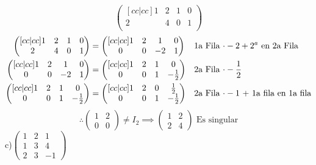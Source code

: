 \documentclass[letterpaper]{article}
\renewcommand{\*}{\cdot}
\theoremstyle{definition}
\begin{document}
	\[\begin{pmatrix}[cc|cc]
	1 & 2 & 1 & 0 \\
	2 & 4 & 0 & 1 \\
	\end{pmatrix}\]
	\begin{align*}
		\begin{pmatrix}[cc|cc]
		1 & 2 & 1 & 0 \\
		2 & 4 & 0 & 1 \\
		\end{pmatrix} & = \begin{pmatrix}[cc|cc]
		1 & 2 & 1 & 0 \\
		0 & 0 & -2 & 1 \\
		\end{pmatrix} && \text{1a Fila $ \* -2  + 2^a$ en 2a Fila}\\
		\begin{pmatrix}[cc|cc]
		1 & 2 & 1 & 0 \\
		0 & 0 & -2 & 1 \\
		\end{pmatrix} & = \begin{pmatrix}[cc|cc]
		1 & 2 & 1 & 0 \\
		0 & 0 & 1 & -\frac{1}{2} \\
		\end{pmatrix} && \text{2a Fila $ \* - \dfrac{1}{2} $}\\
		\begin{pmatrix}[cc|cc]
		1 & 2 & 1 & 0 \\
		0 & 0 & 1 & -\frac{1}{2} \\
		\end{pmatrix} & = \begin{pmatrix}[cc|cc]
		1 & 2 & 0 & \frac{1}{2} \\
		0 & 0 & 1 & -\frac{1}{2} \\
		\end{pmatrix} && \text{2a Fila $ \* -1 $ + 1a fila en 1a fila}
	\end{align*}
	\[ \therefore \begin{pmatrix}
	1 & 2 \\
	0 & 0 
	\end{pmatrix} \neq I_2 \implies \begin{pmatrix}
	1 & 2 \\
	2 & 4 
	\end{pmatrix} \text{ Es singular} \]
	c)$\begin{pmatrix} 1 & 2 & 1 \\ 1 & 3 & 4 \\ 2 & 3 & -1 \end{pmatrix}$\\
\end{document}
